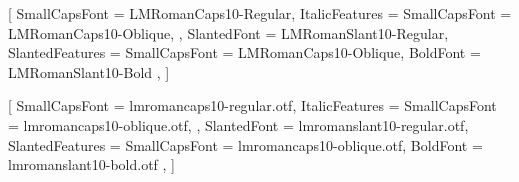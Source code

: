     \ifluatex
      \setmainfont{Latin Modern Roman}[
        SmallCapsFont = {LMRomanCaps10-Regular},
        ItalicFeatures = {
          SmallCapsFont = {LMRomanCaps10-Oblique},
        },
        SlantedFont = {LMRomanSlant10-Regular},
        SlantedFeatures = {
          SmallCapsFont = {LMRomanCaps10-Oblique},
          BoldFont = {LMRomanSlant10-Bold}
        },
      ]
    \fi

    \ifxetex
      \setmainfont{lmroman10-regular.otf}[
        SmallCapsFont = {lmromancaps10-regular.otf},
        ItalicFeatures = {
          SmallCapsFont = {lmromancaps10-oblique.otf},
        },
        SlantedFont = {lmromanslant10-regular.otf},
        SlantedFeatures = {
          SmallCapsFont = {lmromancaps10-oblique.otf},
          BoldFont = {lmromanslant10-bold.otf}
        },
      ]
    \fi

\else

    \usepackage{fontaxes}

    \usepackage{lmodern}


    \usepackage{fix-cm}

    \selectfont

